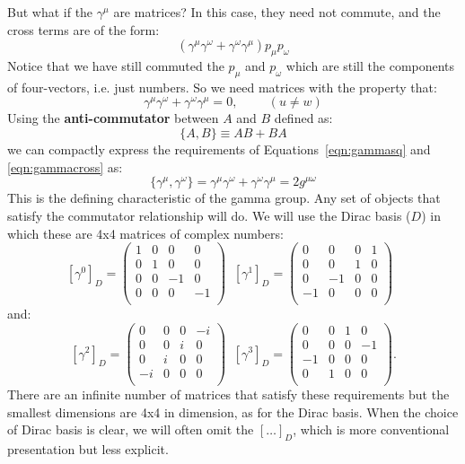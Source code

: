\documentclass[12pt]{article}
\begin{document}
But what if the $\gamma^\mu$ are matrices?  In this case, they need not commute, and the cross terms are of the form:
$$(\gamma^\mu \gamma^\omega + \gamma^\omega \gamma^\mu) p_\mu p_\omega$$
Notice that we have still commuted the $p_\mu$ and $p_\omega$ which are still the components of four-vectors, i.e. just numbers.  So we need matrices with the property that:
\begin{equation}
\label{eqn:gammacross}
\gamma^\mu \gamma^\omega + \gamma^\omega \gamma^\mu = 0, \hspace{1cm} (u \neq w)
\end{equation}
Using the {\bf anti-commutator} between $A$ and $B$ defined as:
$$\{A, B\} \equiv A B + B A$$
we can compactly express the requirements of Equations~\ref{eqn:gammasq} and \ref{eqn:gammacross} as:
\begin{equation}
\label{eqn:gammaanti}
\{\gamma^\mu, \gamma^\omega\} = \gamma^\mu \gamma^\omega + \gamma^\omega \gamma^\mu
= 2 g^{\mu \omega}
\end{equation}
This is the defining characteristic of the gamma group.  Any set of objects that satisfy the commutator relationship will do.  We will use the Dirac basis ($D$) in which these are 4x4 matrices of complex numbers:
$$[\gamma^0]_D = \begin{pmatrix}
1 & 0 & 0 & 0 \\
0 & 1 & 0 & 0 \\
0 & 0 &-1 & 0 \\
0 & 0 & 0 &-1 \\
\end{pmatrix} \;\;
[\gamma^1]_D = \begin{pmatrix}
0 & 0 & 0 & 1 \\
0 & 0 & 1 & 0 \\
0 &-1 & 0 & 0 \\
-1& 0 & 0 & 0 \\
\end{pmatrix} \;\;
$$
and:
$$
[\gamma^2]_D = \begin{pmatrix}
 0 & 0 & 0 &-i \\
 0 & 0 & i & 0 \\
 0 & i & 0 & 0 \\
-i & 0 & 0 & 0 \\
\end{pmatrix} \;\;
[\gamma^3]_D = \begin{pmatrix}
0 & 0 & 1 & 0 \\
0 & 0 & 0 &-1 \\
-1& 0 & 0 & 0 \\
0 & 1 & 0 & 0 \\
\end{pmatrix}.
$$
There are an infinite number of matrices that satisfy these
requirements but the smallest dimensions are 4x4 in dimension, as for
the Dirac basis.  When the choice of Dirac basis is clear, we will
often omit the $[\ldots]_D$, which is more conventional presentation
but less explicit.
\end{document}
